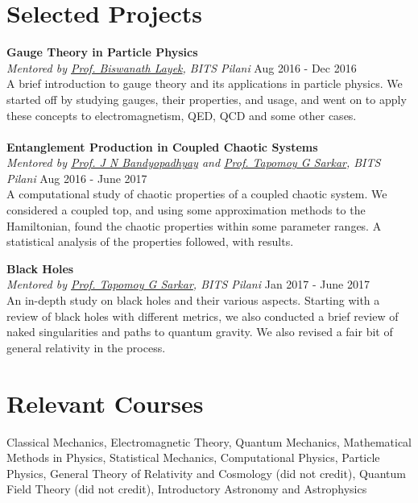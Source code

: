 \documentclass[margin, centered]{res}
\begin{document}
\begin{resume}
\section{Selected Projects}

\textbf{Gauge Theory in Particle Physics}\\
\emph{Mentored by \href{http://universe.bits-pilani.ac.in/pilani/layek/profile}{Prof. Biswanath Layek}, BITS Pilani} \hfill Aug 2016 - Dec 2016\\
A brief introduction to gauge theory and its applications in particle physics. We started off by studying gauges, their properties, and usage, and went on to apply these concepts to electromagnetism, QED, QCD and some other cases. \\
\\
\textbf{Entanglement Production in Coupled Chaotic Systems}\\
\emph{Mentored by \href{http://www.bits-pilani.ac.in/Pilani/jayendra/Profile}{Prof. J N Bandyopadhyay} and \href{http://www.bits-pilani.ac.in/Pilani/tapomoy/Profile}{Prof. Tapomoy G Sarkar}, BITS Pilani} \hfill Aug 2016 - June 2017\\
A computational study of chaotic properties of a coupled chaotic system. We considered a coupled top, and using some approximation methods to the Hamiltonian, found the chaotic properties within some parameter ranges. A statistical analysis of the properties followed, with results.

\textbf{Black Holes}\\
\emph{Mentored by \href{http://www.bits-pilani.ac.in/Pilani/tapomoy/Profile}{Prof. Tapomoy G Sarkar}, BITS Pilani} \hfill Jan 2017 - June 2017\\
An in-depth study on black holes and their various aspects. Starting with a review of black holes with different metrics, we also conducted a brief review of naked singularities and paths to quantum gravity. We also revised a fair bit of general relativity in the process.


\section{Relevant \hspace{2mm} Courses}
Classical Mechanics, Electromagnetic Theory, Quantum Mechanics, Mathematical Methods in Physics, Statistical Mechanics, Computational Physics, Particle Physics, General Theory of Relativity and Cosmology (did not credit), Quantum Field Theory (did not credit), Introductory Astronomy and Astrophysics


\end{resume}
\end{document}
